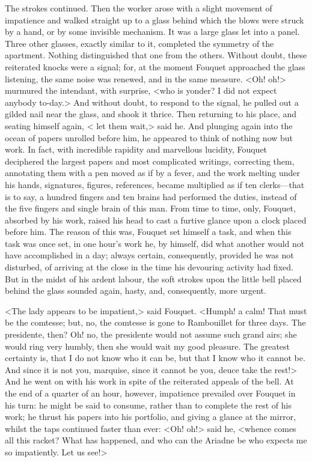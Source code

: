 The strokes continued. Then the worker arose with a slight movement of impatience and walked straight up to a glass behind which the blows were struck by a hand, or by some invisible mechanism. It was a large glass let into a panel. Three other glasses, exactly similar to it, completed the symmetry of the apartment. Nothing distinguished that one from the others. Without doubt, these reiterated knocks were a signal; for, at the moment Fouquet approached the glass listening, the same noise was renewed, and in the same measure. <Oh! oh!> murmured the intendant, with surprise, <who is yonder? I did not expect anybody to-day.> And without doubt, to respond to the signal, he pulled out a gilded nail near the glass, and shook it thrice. Then returning to his place, and seating himself again, < let them wait,> said he. And plunging again into the ocean of papers unrolled before him, he appeared to think of nothing now but work. In fact, with incredible rapidity and marvellous lucidity, Fouquet deciphered the largest papers and most complicated writings, correcting them, annotating them with a pen moved as if by a fever, and the work melting under his hands, signatures, figures, references, became multiplied as if ten clerks—that is to say, a hundred fingers and ten brains had performed the duties, instead of the five fingers and single brain of this man. From time to time, only, Fouquet, absorbed by his work, raised his head to cast a furtive glance upon a clock placed before him. The reason of this was, Fouquet set himself a task, and when this task was once set, in one hour's work he, by himself, did what another would not have accomplished in a day; always certain, consequently, provided he was not disturbed, of arriving at the close in the time his devouring activity had fixed. But in the midst of his ardent labour, the soft strokes upon the little bell placed behind the glass sounded again, hasty, and, consequently, more urgent.

<The lady appears to be impatient,> said Fouquet. <Humph! a calm! That must be the comtesse; but, no, the comtesse is gone to Rambouillet for three days. The presidente, then? Oh! no, the presidente would not assume such grand airs; she would ring very humbly, then she would wait my good pleasure. The greatest certainty is, that I do not know who it can be, but that I know who it cannot be. And since it is not you, marquise, since it cannot be you, deuce take the rest!> And he went on with his work in spite of the reiterated appeals of the bell. At the end of a quarter of an hour, however, impatience prevailed over Fouquet in his turn: he might be said to consume, rather than to complete the rest of his work; he thrust his papers into his portfolio, and giving a glance at the mirror, whilst the taps continued faster than ever: <Oh! oh!> said he, <whence comes all this racket? What has happened, and who can the Ariadne be who expects me so impatiently. Let us see!>

